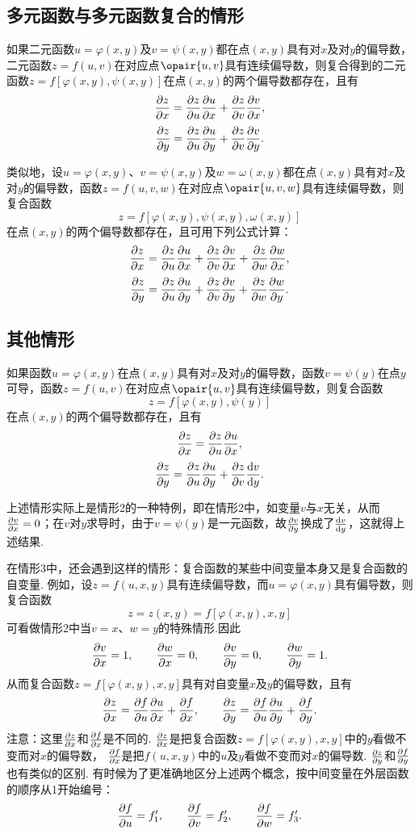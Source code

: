 \subsection{多元函数与多元函数复合的情形}
\begin{theorem}
如果二元函数\(u=\varphi(x,y)\)及\(v=\psi(x,y)\)都在点\((x,y)\)具有对\(x\)及对\(y\)的偏导数，二元函数\(z=f(u,v)\)在对应点\(\opair{u,v}\)具有连续偏导数，则复合得到的二元函数\(z=f[\varphi(x,y),\psi(x,y)]\)在点\((x,y)\)的两个偏导数都存在，且有\[
\pdv{z}{x} = \pdv{z}{u}\pdv{u}{x} + \pdv{z}{v}\pdv{v}{x},
\]\[
\pdv{z}{y} = \pdv{z}{u}\pdv{u}{y} + \pdv{z}{v}\pdv{v}{y}.
\]
\end{theorem}
类似地，设\(u=\varphi(x,y)\)、\(v=\psi(x,y)\)及\(w=\omega(x,y)\)都在点\((x,y)\)具有对\(x\)及对\(y\)的偏导数，函数\(z=f(u,v,w)\)在对应点\(\opair{u,v,w}\)具有连续偏导数，则复合函数\[
z = f[\varphi(x,y),\psi(x,y),\omega(x,y)]
\]在点\((x,y)\)的两个偏导数都存在，且可用下列公式计算：\[
\pdv{z}{x} = \pdv{z}{u}\pdv{u}{x} + \pdv{z}{v}\pdv{v}{x} + \pdv{z}{w}\pdv{w}{x},
\]\[
\pdv{z}{y} = \pdv{z}{u}\pdv{u}{y} + \pdv{z}{v}\pdv{v}{y} + \pdv{z}{w}\pdv{w}{y}.
\]

\subsection{其他情形}
\begin{theorem}
如果函数\(u=\varphi(x,y)\)在点\((x,y)\)具有对\(x\)及对\(y\)的偏导数，函数\(v=\psi(y)\)在点\(y\)可导，函数\(z=f(u,v)\)在对应点\(\opair{u,v}\)具有连续偏导数，则复合函数\[
z = f[\varphi(x,y),\psi(y)]
\]在点\((x,y)\)的两个偏导数都存在，且有\[
\pdv{z}{x} = \pdv{z}{u} \pdv{u}{x},
\]\[
\pdv{z}{y} = \pdv{z}{u} \pdv{u}{y} + \pdv{z}{v} \dv{v}{y}.
\]
\end{theorem}
上述情形实际上是情形2的一种特例，即在情形2中，如变量\(v\)与\(x\)无关，从而\(\pdv{v}{x}=0\)；在\(v\)对\(y\)求导时，由于\(v=\psi(y)\)是一元函数，故\(\pdv{v}{y}\)换成了\(\dv{v}{y}\)，这就得上述结果.

在情形3中，还会遇到这样的情形：复合函数的某些中间变量本身又是复合函数的自变量.
例如，设\(z = f(u,x,y)\)具有连续偏导数，而\(u=\varphi(x,y)\)具有偏导数，则复合函数\[
z = z(x,y) = f[\varphi(x,y),x,y]
\]可看做情形2中当\(v=x\)、\(w=y\)的特殊情形.因此\[
\pdv{v}{x} = 1, \qquad \pdv{w}{x} = 0,
\qquad
\pdv{v}{y} = 0, \qquad \pdv{w}{y} = 1.
\]从而复合函数\(z = f[\varphi(x,y),x,y]\)具有对自变量\(x\)及\(y\)的偏导数，且有\[
\pdv{z}{x} = \pdv{f}{u} \pdv{u}{x} + \pdv{f}{x},
\qquad
\pdv{z}{y} = \pdv{f}{u} \pdv{u}{y} + \pdv{f}{y}.
\]
注意：这里\(\pdv{z}{x}\)和\(\pdv{f}{x}\)是不同的.
\(\pdv{z}{x}\)是把复合函数\(z = f[\varphi(x,y),x,y]\)中的\(y\)看做不变而对\(x\)的偏导数，
\(\pdv{f}{x}\)是把\(f(u,x,y)\)中的\(u\)及\(y\)看做不变而对\(x\)的偏导数.
\(\pdv{z}{y}\)和\(\pdv{f}{y}\)也有类似的区别.
有时候为了更准确地区分上述两个概念，按中间变量在外层函数的顺序从1开始编号：\[
\pdv{f}{u} = f_1', \qquad
\pdv{f}{v} = f_2', \qquad
\pdv{f}{w} = f_3'.
\]

